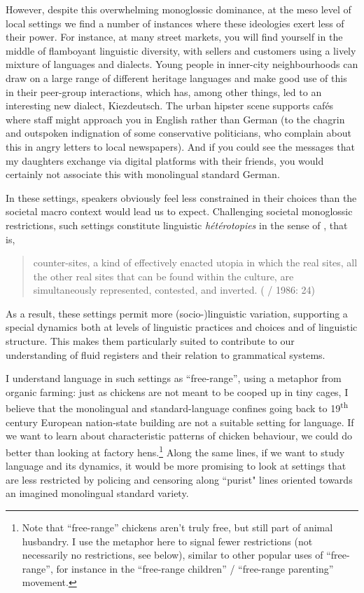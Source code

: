 \hspace*{-1.2pt}However, despite this overwhelming monoglossic dominance, at the meso level of local settings we find a number of instances where these ideologies exert less of their power. For instance, at many street markets, you will find yourself in the middle of flamboyant linguistic diversity, with sellers and customers using a lively mixture of languages and dialects. Young people in inner-city neighbourhoods can draw on a large range of different heritage languages and make good use of this in their peer-group interactions, which has, among other things, led to an interesting new dialect, Kiezdeutsch. The urban hipster scene supports cafés where staff might approach you in English rather than German (to the chagrin and outspoken indignation of some conservative politicians, who complain about this in angry letters to local newspapers). And if you could see the messages that my daughters exchange via digital platforms with their friends, you would certainly not associate this with monolingual standard German.

In these settings, speakers obviously feel less constrained in their choices than the societal macro context would lead us to expect. Challenging societal mono\-glossic restrictions, such settings constitute linguistic \textit{hétérotopies} in the sense of \citet{Foucault1967}, that is,

\begin{quote}
counter-sites, a kind of effectively enacted utopia in which the real sites, all the other real sites that can be found within the culture, are simultaneously represented, contested, and inverted. (\cite{Foucault1967} / 1986: 24)
\end{quote}

As a result, these settings permit more (socio-)linguistic variation, supporting a special dynamics both at levels of linguistic practices and choices and of linguistic structure. This makes them particularly suited to contribute to our understanding of fluid registers and their relation to grammatical systems.

I understand language in such settings as “free-range”, using a metaphor from organic farming: just as chickens are not meant to be cooped up in tiny cages, I believe that the monolingual and standard-language confines going back to 19\textsuperscript{th} century European nation-state building are not a suitable setting for language. If we want to learn about characteristic patterns of chicken behaviour, we could do better than looking at factory hens.\footnote{Note that “free-range” chickens aren’t truly free, but still part of animal husbandry. I use the metaphor here to signal fewer restrictions (not necessarily no restrictions, see below), similar to other popular uses of “free-range”, for instance in the “free-range children” / “free-range parenting” movement.} Along the same lines, if we want to study language and its dynamics, it would be more promising to look at settings that are less restricted by policing and censoring along “purist" lines oriented towards an imagined monolingual standard variety.


